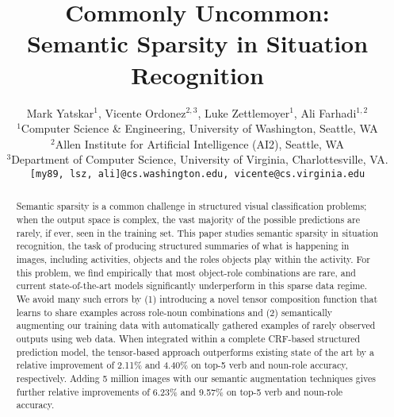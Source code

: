 \documentclass[10pt,twocolumn,letterpaper]{article}
\begin{document}
\title{Commonly Uncommon:\\Semantic Sparsity in Situation Recognition}

\author{Mark Yatskar$^1$,  Vicente Ordonez$^{2,3}$, Luke Zettlemoyer$^1$, Ali Farhadi$^{1,2}$ \\
        $^1$Computer Science \& Engineering, University of Washington, Seattle, WA\\
        $^2$Allen Institute for Artificial Intelligence (AI2), Seattle, WA\\
        $^3$Department of Computer Science, University of Virginia, Charlottesville, VA. \\
	    {\tt [my89, lsz, ali]@cs.washington.edu, vicente@cs.virginia.edu}
  }


\maketitle


\begin{abstract}
Semantic sparsity is a common challenge in structured visual classification problems; when the output space is complex, the vast majority of the possible predictions are rarely, if ever, seen in the training set. 
This paper studies semantic sparsity in situation recognition, the task of producing structured summaries of what is happening in images, including activities, objects and the roles objects play within the activity. 
For this problem, we find empirically that most object-role combinations are rare, and current state-of-the-art models significantly underperform in this sparse data regime.
We avoid many such errors by (1) introducing a novel tensor composition function that learns to share examples across role-noun combinations and (2) semantically augmenting our training data with automatically gathered examples of rarely observed outputs using web data.
When integrated within a complete CRF-based structured prediction model, the tensor-based approach outperforms existing state of the art by a relative improvement of 2.11\%  and 4.40\% on top-5 verb and noun-role accuracy, respectively.
Adding 5 million images with our semantic augmentation techniques gives further relative improvements of 6.23\% and 9.57\% on top-5 verb and noun-role accuracy.
\end{abstract} 
\end{document}
